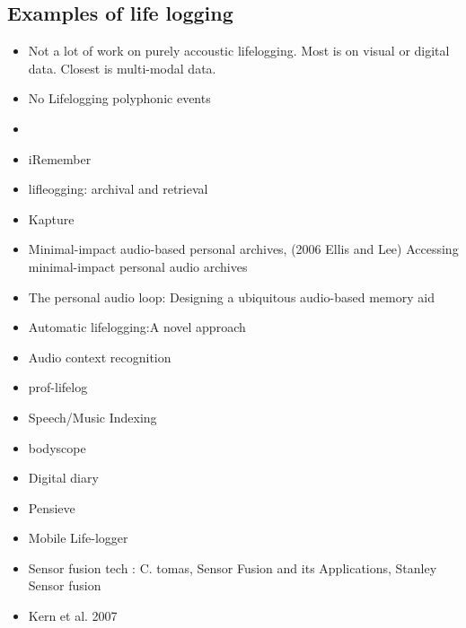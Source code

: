 \subsection{Examples of life logging}

\begin{itemize}
	\item Not a lot of work on purely accoustic lifelogging. Most is on visual or digital data. Closest is multi-modal data.
	\item No Lifelogging polyphonic events
	\item 
\end{itemize}

\begin{itemize}
	\item iRemember
	\item lifleogging: archival and retrieval
	\item Kapture
	\item Minimal-impact audio-based personal archives, (2006 Ellis and Lee) Accessing minimal-impact personal audio archives
	\item The personal audio loop: Designing a ubiquitous audio-based memory aid
	\item Automatic lifelogging:A novel approach
	\item Audio context recognition
	\item prof-lifelog
	\item Speech/Music Indexing
	\item bodyscope
\end{itemize}

\begin{itemize}
	\item Digital diary
	\item Pensieve
	\item Mobile Life-logger
	\item Sensor fusion tech : C. tomas, Sensor Fusion and its Applications, Stanley Sensor fusion
	\item Kern et al. 2007
\end{itemize}


